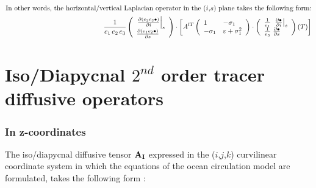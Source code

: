 \documentclass[../main/NEMO_manual]{subfiles}
\begin{document}
\begin{align*}
{\begin{array}{*{20}l}
    \intertext{In other words, the horizontal/vertical Laplacian operator in the ($i$,$s$) plane takes the following form:}
  \end{array}
  } \\
  {\frac{1}{e_1\,e_2\,e_3}}
  \left( {{
  \begin{array}{*{30}c}
    {\left. {\frac{\partial \left( {e_2 e_3 \bullet } \right)}{\partial i}} \right|_s } \hfill \\
    {\frac{\partial \left( {e_1 e_2 \bullet } \right)}{\partial s}} \hfill \\
  \end{array}}}
  \right)
  \cdot \left[ {A^{lT}
  \left( {{
  \begin{array}{*{30}c}
    {1} \hfill & {-\sigma_1 } \hfill \\
    {-\sigma_1} \hfill & {\varepsilon + \sigma_1^2} \hfill \\
  \end{array}
  }} \right)
  \cdot
  \left( {{
  \begin{array}{*{30}c}
    {\frac{1}{e_1 }\;\left. {\frac{\partial \bullet }{\partial i}} \right|_s } \hfill \\
    {\frac{1}{e_3 }\;\frac{\partial \bullet }{\partial s}} \hfill \\
  \end{array}
  }}       \right) \left( T \right)} \right]
\end{align*}

\section{Iso/Diapycnal $2^{nd}$ order tracer diffusive operators}
\label{sec:DIFFOPERS_2}

\subsubsection*{In z-coordinates}

The iso/diapycnal diffusive tensor $\textbf {A}_{\textbf I}$ expressed in
the ($i$,$j$,$k$) curvilinear coordinate system in which
the equations of the ocean circulation model are formulated,
takes the following form \citep{redi_JPO82}:
\end{document}
